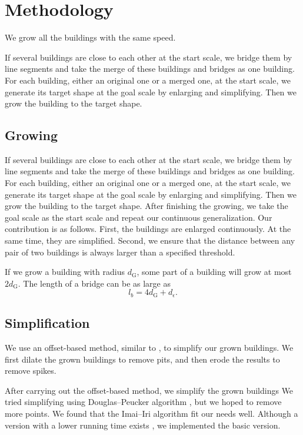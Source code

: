 \documentclass[graybox]{svmult}
\begin{document}
\section{Methodology}

We grow all the buildings with the same speed.


If several buildings are close to each other at the start 
scale, we bridge them by line segments and take the merge of these 
buildings 
and bridges as one building.
For each building, either an original one or a merged one, at the start 
scale, 
we generate its target shape at 
the goal scale by enlarging and simplifying. Then we grow the  
building to the target shape. 

\subsection{Growing}
If several buildings are close to each other at the start 
scale, we bridge them by line segments and take the merge of these 
buildings 
and bridges as one building.
For each building, either an original one or a merged one, at the start 
scale, 
we generate its target shape at 
the goal scale by enlarging and simplifying. Then we grow the  
building to the target shape. 
%
After finishing the growing, we take the goal scale as the 
start scale and repeat our continuous generalization.
\newline\indent
Our contribution is as follows. First, the buildings 
are enlarged continuously. At the same time, they are simplified. 
Second, we ensure that the distance between any pair of two buildings is 
always larger than a specified threshold.

If we grow a building with radius $d_\mathrm{G}$, some part of a building will 
grow at most $2d_\mathrm{G}$.
The length of a bridge can be as large as
\begin{equation}
\label{eq:BridgeLength}
l_b=4d_\mathrm{G}+d_\epsilon.
\end{equation}

\subsection{Simplification}
We use an offset-based method, similar to \textcite{Damen2008,Meijers2016}, to 
simplify our grown buildings. We first dilate the grown buildings to remove 
pits, and then erode the results to remove spikes.

After carrying out the offset-based method, we simplify the grown buildings 
We tried simplifying using Douglas--Peucker algorithm \parencite{Douglas1973}, 
but we hoped to remove more points. We found that the Imai--Iri 
algorithm \parencite{ImaiIri1988} fit our needs well. Although a version with a 
lower running time exists \parencite[see][]{Chan1992}, we implemented the basic 
version.
\end{document}
